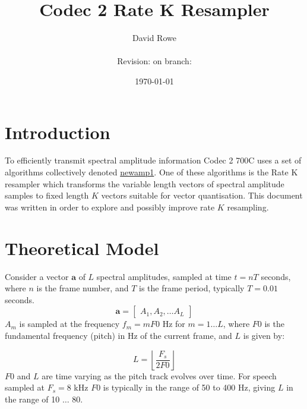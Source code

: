\documentclass{article}
\title{Codec 2 Rate K Resampler}
\author{David Rowe\\ \\ Revision: {\gitrevision} on branch: {\branch}}
\date{\today}
\begin{document}
\maketitle

\section{Introduction}

To efficiently transmit spectral amplitude information Codec 2 700C uses a set of algorithms collectively denoted \url{newamp1}. One of these algorithms is the Rate K resampler which transforms the variable length vectors of spectral amplitude samples to fixed length $K$ vectors suitable for vector quantisation.  This document was written in order to explore and possibly improve rate $K$ resampling.

\section{Theoretical Model}

Consider a vector $\mathbf{a}$ of $L$ spectral amplitudes, sampled at time $t=nT$ seconds, where $n$ is the frame number, and $T$ is the frame period, typically $T=0.01$ seconds. 
\begin{equation}
\mathbf{a} = \begin{bmatrix} A_1, A_2, \ldots A_L \end{bmatrix} 
\end{equation}
$A_m$ is sampled at the frequency $f_m=mF0$ Hz for $m=1 \ldots L$, where $F0$ is the fundamental frequency (pitch) in Hz of the current frame, and $L$ is given by:

\begin{equation}
L=\left \lfloor \frac{F_s}{2F0} \right \rfloor
\end{equation}
$F0$ and $L$ are time varying as the pitch track evolves over time. For speech sampled at $F_s=8$ kHz $F0$ is typically in the range of 50 to 400 Hz, giving $L$ in the range of 10 $\ldots$ 80. \\
\end{document}
